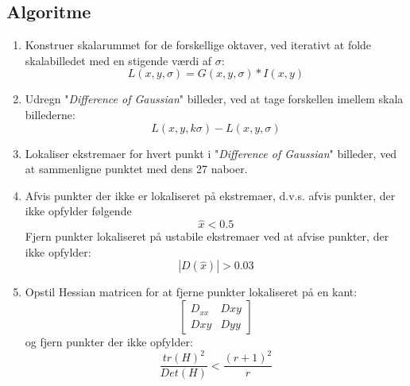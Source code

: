\subsection*{Algoritme}
\begin{enumerate}
\item{Konstruer skalarummet for de forskellige oktaver, ved iterativt at folde skalabilledet med en stigende værdi af $\sigma$: $$ L(x,y,\sigma)= G(x,y,\sigma) \ast I(x,y) $$}
\item{Udregn "\textit{Difference of Gaussian}" billeder, ved at tage forskellen imellem skala billederne: $$ L(x,y,k \sigma)-L(x,y,\sigma)$$ }
\item{Lokaliser ekstremaer for hvert punkt i "\textit{Difference of Gaussian}" billeder, ved at sammenligne punktet med dens 27 naboer.}
\item{Afvis punkter der ikke er lokaliseret på ekstremaer, d.v.s. afvis punkter, der ikke opfylder følgende 
$$ \hat{x}<0.5 $$
Fjern punkter lokaliseret på ustabile ekstremaer ved at afvise punkter, der ikke opfylder:
$$ |D(\hat{x})|>0.03 $$}
\item{ Opstil Hessian matricen for at fjerne punkter lokaliseret på en kant: $$ \begin{bmatrix}
D_{xx} & D{xy} \\
D{xy} & D{yy}
\end{bmatrix} $$ 
og fjern punkter der ikke opfylder:
$$ \dfrac{tr(H)^2}{Det(H)}<\dfrac{(r+1)^2}{r}
$$
}
\end{enumerate}